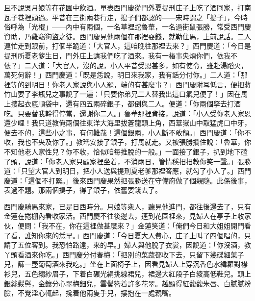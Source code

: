 且不說吳月娘等在花園中飲酒。單表西門慶從門外夏提刑庄子上吃了酒囘家，打南瓦子巷裡頭過。平昔在三街兩巷行走，搗子們都認的——宋時謂之「搗子」，今時俗呼為「光棍」——內中有兩個，一名草裡蛇魯華，一名過街鼠張勝，常受西門慶資助，乃雞竊狗盜之徒。西門慶見他兩個在那裡耍錢，就勒住馬，上前說話。二人連忙走到跟前，打個半跪道：「大官人，這咱晚往那裡去來？」西門慶道：「今日是提刑所夏老爹生日，門外庄上請我們吃了酒來。我有一樁事央煩你們，依我不依？」二人道：「大官人，沒的說，小人平昔受恩甚多，如有使令，雖赴湯蹈火，萬死何辭！」西門慶道：「既是恁說，明日來我家，我有話分付你。」二人道：「那裡等的到明日！你老人家說與小人罷，端的有甚麼事？」西門慶附耳低言，便把蔣竹山要了李瓶兒之事說了一遍：「只要你弟兄二人替我出這口氣兒便了！」因在馬上摟起衣底順袋中，還有四五兩碎銀子，都倒與二人。便道：「你兩個拏去打酒吃。只要替我幹得停當，還謝你二人。」魯華那裡肯接，說道：「小人受你老人家恩還少哩！我只道教俺兩個往東洋大海里拔蒼龍頭上角，西華嶽山中取猛虎口中牙，便去不的，這些小之事，有何難哉！這個銀兩，小人斷不敢領。」西門慶道：「你不收，我也不央及你了。」教玳安接了銀子，打馬就走。又被張勝攔住說：「魯華，你不知他老人家性兒？你不收，恰似咱每推脫的一般。」一面接了銀子，扒到地下磕了頭，說道：「你老人家只顧家裡坐着，不消兩日，管情穩抇抇教你笑一聲。」{}張勝道：「只望大官人到明日，把小人送與提刑夏老爹那裡答應，就勾了小人了。」西門慶道：「這個不打緊。」後來西門慶果然把張勝送在守備府做了個親隨。{}此係後事，表過不題。那兩個搗子，得了銀子，依舊耍錢去了。

西門慶騎馬來家，已是日西時分。月娘等衆人，聽見他進門，都往後邊去了，只有金蓮在捲棚內看收家活。西門慶不往後邊去，逕到花園裡來，見婦人在亭子上收家伙，便問：「我不在，你在這裡做甚麼來？」金蓮笑道：「俺們今日和大姐姐開門看了看，誰知你來的恁早。」西門慶道：「今日夏大人費心，庄子上叫了四個唱的，只請了五位客到。我恐怕路遠，來的早。」婦人與他脫了衣裳，因說道：「你沒酒，教丫頭看酒來你吃。」西門慶分付春梅：「把別的菜蔬都收下去，只留下幾碟細菓子兒，篩一壺葡萄酒來我吃。」坐在上面椅子上，因看見婦人上穿沉香色水緯羅對襟衫兒，五色縐紗眉子，下着白碾光絹挑線裙兒，裙邊大紅段子白綾高低鞋兒。頭上銀絲鬏髻，金鑲分心翠梅鈿兒，雲鬢簪着許多花翠。越顯得紅馥馥朱唇、白膩膩粉臉，{}不覺淫心輒起，攙着他兩隻手兒，摟抱在一處親嘴。

